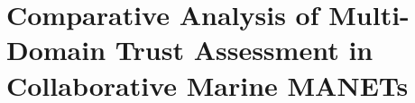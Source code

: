 \def\ChapterTitle{Comparative Analysis of Multi-Domain Trust Assessment in Collaborative Marine MANETs}

\ifx\ifthesis\undefined

\else
\chapter{\ChapterTitle}
\label{Chapter\thechapter}
\fi


\ifx\ifthesis\undefined
	
\else
\fi
